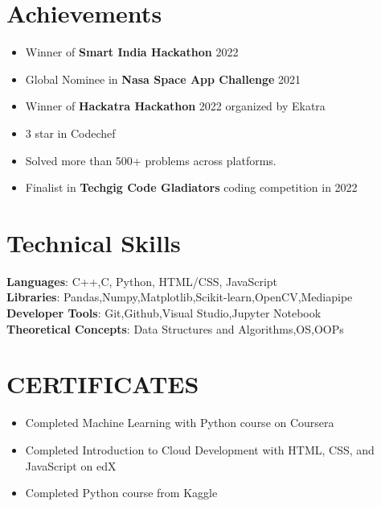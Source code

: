 \documentclass[letterpaper,11pt]{article}
\newcommand{\resumeItem}[1]{
  \item\small{
	{#1 \vspace{-2pt}}
  }
}
\newcommand{\resumeItemListStart}{\begin{itemize}}
\newcommand{\resumeItemListEnd}{\end{itemize}\vspace{-5pt}}
\begin{document}
%
\section{Achievements}
 \begin{itemize}[leftmargin=0.15in, label={}]
	\resumeItemListStart
    	\resumeItem{Winner of \textbf{Smart India Hackathon} 2022}
    	\resumeItem{Global Nominee in \textbf{Nasa Space App Challenge} 2021}
    	\resumeItem{Winner of \textbf{Hackatra Hackathon} 2022 organized by Ekatra}
    	\resumeItem{ 3 star in Codechef}
    	\resumeItem{Solved more than 500+ problems across platforms.}
    	\resumeItem{Finalist in \textbf{Techgig Code Gladiators} coding competition in 2022}
  	\resumeItemListEnd
 \end{itemize}
 \vspace{-16pt}
 
    

%


\section{Technical Skills}
 \begin{itemize}[leftmargin=0.15in, label={}]
	\small{\item{
 	\textbf{Languages}{: C++,C, Python, HTML/CSS, JavaScript } \\
 	\textbf{Libraries}{: Pandas,Numpy,Matplotlib,Scikit-learn,OpenCV,Mediapipe} \\
 	\textbf{Developer Tools}{: Git,Github,Visual Studio,Jupyter Notebook}\\
 	\textbf{Theoretical Concepts}{: Data Structures and Algorithms,OS,OOPs}
	}}
 \end{itemize}
 \vspace{-16pt}



\section{CERTIFICATES}
 \begin{itemize}[leftmargin=0.15in, label={}]
	\resumeItemListStart
    	\resumeItem{Completed Machine Learning with Python course on Coursera}
    	\resumeItem{Completed Introduction to Cloud Development with HTML, CSS, and JavaScript on edX}
    	\resumeItem{Completed Python course from Kaggle}
  	\resumeItemListEnd
 \end{itemize}
\end{document}
